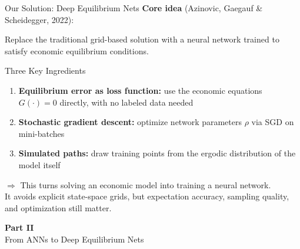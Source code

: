\documentclass[aspectratio=169,11pt]{beamer}
\newcommand{\emphc}[1]{\textcolor{harvardcrimson}{#1}}
\begin{document}
\begin{frame}{Our Solution: Deep Equilibrium Nets}
\textbf{Core idea} (Azinovic, Gaegauf \& Scheidegger, 2022):

\vspace{0.3em}
Replace the traditional grid-based solution with a \emphc{neural network} trained to satisfy economic equilibrium conditions.

\vspace{0.5em}
\begin{block}{Three Key Ingredients}
\begin{enumerate}
    \item \textbf{Equilibrium error as loss function:} use the economic equations $G(\cdot) = 0$ directly, with \emphc{no labeled data} needed
    \item \textbf{Stochastic gradient descent:} optimize network parameters $\rho$ via SGD on mini-batches
    \item \textbf{Simulated paths:} draw training points from the \emphc{ergodic distribution} of the model itself
\end{enumerate}
\end{block}

\vspace{0.3em}
{\small $\Rightarrow$ This turns \emphc{solving} an economic model into \emphc{training} a neural network.}
\\[2pt]
{\scriptsize It avoids explicit state-space grids, but expectation accuracy, sampling quality, and optimization still matter.}
\end{frame}


\begin{frame}{}
\vfill
\begin{center}
{\Huge \textcolor{uzhblue}{\textbf{Part II}}}\\[12pt]
{\LARGE From ANNs to Deep Equilibrium Nets}
\end{center}
\vfill
\end{frame}
\end{document}
